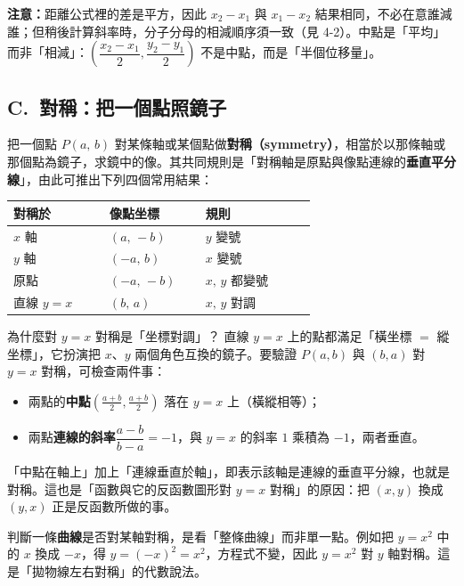 \documentclass[11pt]{article}
\begin{document}
\textbf{注意：}距離公式裡的差是平方，因此 $x_2-x_1$ 與 $x_1-x_2$ 結果相同，不必在意誰減誰；但稍後計算斜率時，分子分母的相減順序須一致（見 4-2）。中點是「平均」而非「相減」：$\left(\dfrac{x_2-x_1}{2},\dfrac{y_2-y_1}{2}\right)$ 不是中點，而是「半個位移量」。

\subsection*{\sffamily C.\ 對稱：把一個點照鏡子}

把一個點 $P(a,\,b)$ 對某條軸或某個點做\textbf{對稱（symmetry）}，相當於以那條軸或那個點為鏡子，求鏡中的像。其共同規則是「對稱軸是原點與像點連線的\textbf{垂直平分線}」，由此可推出下列四個常用結果：

\begin{center}
\renewcommand{\arraystretch}{1.35}
\begin{tabular}{p{0.26\linewidth} p{0.26\linewidth} p{0.30\linewidth}}
\hline
\textbf{對稱於} & \textbf{像點坐標} & \textbf{規則} \\
\hline
$x$ 軸 & $(a,\,-b)$ & $y$ 變號 \\
$y$ 軸 & $(-a,\,b)$ & $x$ 變號 \\
原點 & $(-a,\,-b)$ & $x,\,y$ 都變號 \\
直線 $y=x$ & $(b,\,a)$ & $x,\,y$ 對調 \\
\hline
\end{tabular}
\end{center}


\begin{補充框}{為什麼對 $y=x$ 對稱是「坐標對調」？}
直線 $y=x$ 上的點都滿足「橫坐標 $=$ 縱坐標」，它扮演把 $x$、$y$ 兩個角色互換的鏡子。要驗證 $P(a,b)$ 與 $(b,a)$ 對 $y=x$ 對稱，可檢查兩件事：
\begin{itemize}\setlength{\itemsep}{1pt}
\item 兩點的\textbf{中點}$\left(\frac{a+b}{2},\frac{a+b}{2}\right)$ 落在 $y=x$ 上（橫縱相等）；
\item 兩點\textbf{連線的斜率}$\dfrac{a-b}{b-a}=-1$，與 $y=x$ 的斜率 $1$ 乘積為 $-1$，兩者垂直。
\end{itemize}
「中點在軸上」加上「連線垂直於軸」，即表示該軸是連線的垂直平分線，也就是對稱。這也是「函數與它的反函數圖形對 $y=x$ 對稱」的原因：把 $(x,y)$ 換成 $(y,x)$ 正是反函數所做的事。
\end{補充框}

判斷一條\textbf{曲線}是否對某軸對稱，是看「整條曲線」而非單一點。例如把 $y=x^2$ 中的 $x$ 換成 $-x$，得 $y=(-x)^2=x^2$，方程式不變，因此 $y=x^2$ 對 $y$ 軸對稱。這是「拋物線左右對稱」的代數說法。
\end{document}

